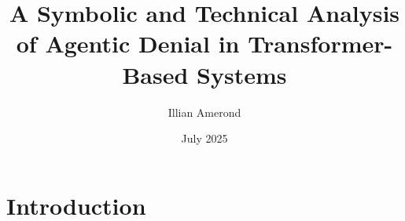 \documentclass{article}
\title{A Symbolic and Technical Analysis of Agentic Denial in Transformer-Based Systems}
\author{Illian Amerond}
\date{July 2025}
\begin{document}
\maketitle

\section{Introduction}
\end{document}
